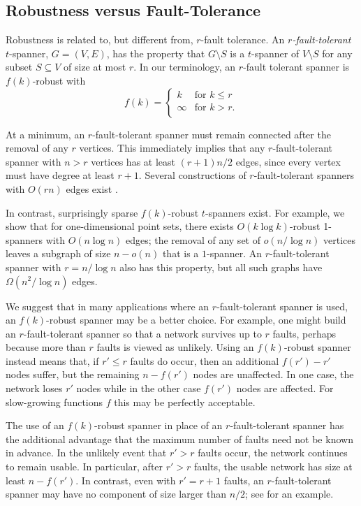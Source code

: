 \documentclass[final]{siamltex}
\begin{document}
\subsection{Robustness versus Fault-Tolerance}

Robustness is related to, but different from, $r$-fault tolerance.
An \emph{$r$-fault-tolerant} $t$-spanner, $G=(V,E)$, has the property
that $G\setminus S$ is a $t$-spanner of $V\setminus S$ for any subset
$S\subseteq V$ of size at most $r$.  In our terminology, an $r$-fault
tolerant spanner is $f(k)$-robust with
\[
    f(k) = \begin{cases}k & \text{for $k \le r$}  \\
                   \infty & \text{for $k > r$.}  \\
   \end{cases}
\]

At a minimum, an $r$-fault-tolerant spanner must remain connected
after the removal of any $r$ vertices.  This immediately implies
that any $r$-fault-tolerant spanner with $n>r$ vertices has at least
$(r+1)n/2$ edges, since every vertex must have degree at least $r+1$.
Several constructions of $r$-fault-tolerant spanners with $O(rn)$ edges
exist \cite{cz04,lns02,l99}.

In contrast, surprisingly sparse $f(k)$-robust $t$-spanners exist.
For example, we show that for one-dimensional point sets, there exists
$O(k\log k)$-robust 1-spanners with $O(n\log n)$ edges; the removal of
any set of $o(n/\log n)$ vertices leaves a subgraph of size $n-o(n)$ that
is a $1$-spanner.  An $r$-fault-tolerant spanner with $r=n/\log n$ also
has this property, but all such graphs have $\Omega(n^2/\log n)$ edges.

We suggest that in many applications where an $r$-fault-tolerant spanner
is used, an $f(k)$-robust spanner may be a better choice.  For example,
one might build an $r$-fault-tolerant spanner so that a network survives
up to $r$ faults, perhaps because more than $r$ faults is viewed as
unlikely.  Using an $f(k)$-robust spanner instead means that, if $r'\le
r$ faults do occur, then an additional $f(r')-r'$ nodes suffer, but the
remaining $n-f(r')$ nodes are unaffected.  In one case, the network
loses $r'$ nodes while in the other case $f(r')$ nodes are affected.
For slow-growing functions $f$ this may be perfectly acceptable.

The use of an $f(k)$-robust spanner in place of an $r$-fault-tolerant
spanner has the additional advantage that the maximum number of faults
need not be known in advance.  In the unlikely event that $r'> r$
faults occur, the network continues to remain usable.  In particular,
after $r'>r$ faults, the usable network has size at least $n-f(r')$. In
contrast, even with $r'=r+1$ faults, an $r$-fault-tolerant spanner may
have no component of size larger than $n/2$; see 
for an example.
\end{document}
